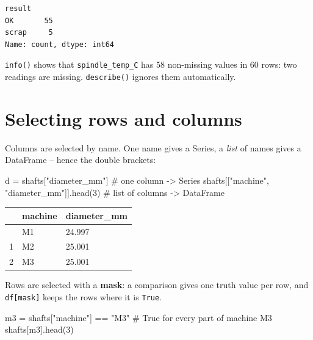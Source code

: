 \documentclass[
  letterpaper,
  DIV=11,
  numbers=noendperiod]{scrreprt}
\newenvironment{Shaded}{\begin{snugshade}}{\end{snugshade}}
\newcommand{\CommentTok}[1]{\textcolor[rgb]{0.37,0.37,0.37}{#1}}
\newcommand{\DecValTok}[1]{\textcolor[rgb]{0.68,0.00,0.00}{#1}}
\newcommand{\NormalTok}[1]{\textcolor[rgb]{0.00,0.23,0.31}{#1}}
\newcommand{\OperatorTok}[1]{\textcolor[rgb]{0.37,0.37,0.37}{#1}}
\newcommand{\StringTok}[1]{\textcolor[rgb]{0.13,0.47,0.30}{#1}}
\begin{document}
\begin{verbatim}
result
OK       55
scrap     5
Name: count, dtype: int64
\end{verbatim}

\texttt{info()} shows that \texttt{spindle\_temp\_C} has 58 non-missing
values in 60 rows: two readings are missing. \texttt{describe()} ignores
them automatically.

\section*{Selecting rows and columns}\label{selecting-rows-and-columns}


Columns are selected by name. One name gives a Series, a \emph{list} of
names gives a DataFrame -- hence the double brackets:

\begin{Shaded}
\begin{Highlighting}[]
\NormalTok{d }\OperatorTok{=}\NormalTok{ shafts[}\StringTok{"diameter\_mm"}\NormalTok{]                         }\CommentTok{\# one column {-}\textgreater{} Series}
\NormalTok{shafts[[}\StringTok{"machine"}\NormalTok{, }\StringTok{"diameter\_mm"}\NormalTok{]].head(}\DecValTok{3}\NormalTok{)        }\CommentTok{\# list of columns {-}\textgreater{} DataFrame}
\end{Highlighting}
\end{Shaded}

\begin{longtable}[]{@{}lll@{}}
\toprule\noalign{}
& machine & diameter\_mm \\
\midrule\noalign{}
\endhead
\bottomrule\noalign{}
\endlastfoot
0 & M1 & 24.997 \\
1 & M2 & 25.001 \\
2 & M3 & 25.001 \\
\end{longtable}

Rows are selected with a \textbf{mask}: a comparison gives one truth
value per row, and \texttt{df{[}mask{]}} keeps the rows where it is
\texttt{True}.

\begin{Shaded}
\begin{Highlighting}[]
\NormalTok{m3 }\OperatorTok{=}\NormalTok{ shafts[}\StringTok{"machine"}\NormalTok{] }\OperatorTok{==} \StringTok{"M3"}                     \CommentTok{\# True for every part of machine M3}
\NormalTok{shafts[m3].head(}\DecValTok{3}\NormalTok{)}
\end{Highlighting}
\end{Shaded}
\end{document}
